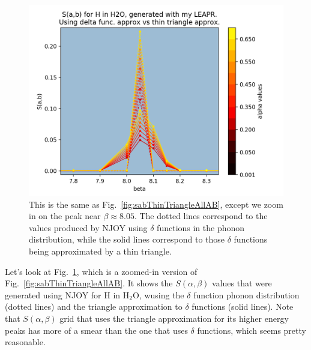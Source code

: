 \documentclass[Master.tex]{subfiles}
\begin{document}
            \begin{figure}[h]
              \begin{center}
              \includegraphics[scale=0.6]{sab_thinTriangle_and_delta_all_AB_Zoomed}
                \caption{This is the same as Fig.~\ref{fig:sabThinTriangleAllAB}, except we zoom in on the peak near $\beta\approx8.05$. The dotted lines correspond to the values produced by NJOY using $\delta$ functions in the phonon distribution, while the solid lines correspond to those $\delta$ functions being approximated by a thin triangle.}
              \label{fig:sabThinTriangleAllABZoomed}
              \end{center}
            \end{figure}


            Let's look at Fig.~\ref{fig:sabThinTriangleAllABZoomed}, which is a zoomed-in version of Fig.~\ref{fig:sabThinTriangleAllAB}. It shows the $S(\alpha,\beta)$ values that were generated using NJOY for H in H$_2$O, wusing the $\delta$ function phonon distribution (dotted lines) and the triangle approximation to $\delta$ functions (solid lines). Note that $S(\alpha,\beta)$ grid that uses the triangle approximation for its higher energy peaks has more of a smear than the one that uses $\delta$ functions, which seems pretty reasonable.
\end{document}
